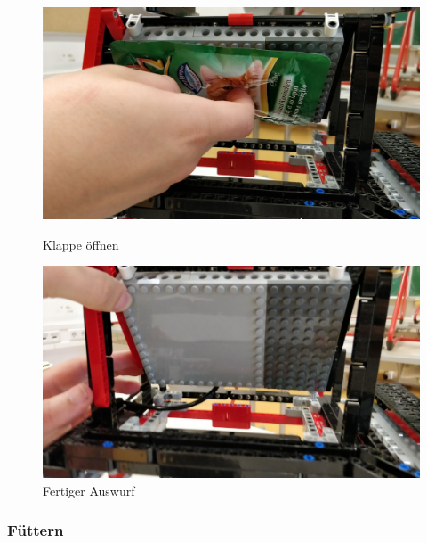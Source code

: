 \begin{figure}[H]
   \begin{minipage}[hbt]{0.5\textwidth} %
      \includegraphics[width=1\textwidth]{Bilder/Ablauf_1_png/Auswurf_4}
      \caption{Klappe öffnen}
      \label{Klappe öffnen}
   \end{minipage}
   \hspace{.04\linewidth}%
   \begin{minipage}[hbt]{0.5\textwidth} %
      \includegraphics[width=1\textwidth]{Bilder/Ablauf_1_png/Auswurf_5}
      \caption{Fertiger Auswurf}
	  \label{Fertiger Auswurf}      
      \end{minipage}
\end{figure}

\newpage
\subsubsection{Füttern}

